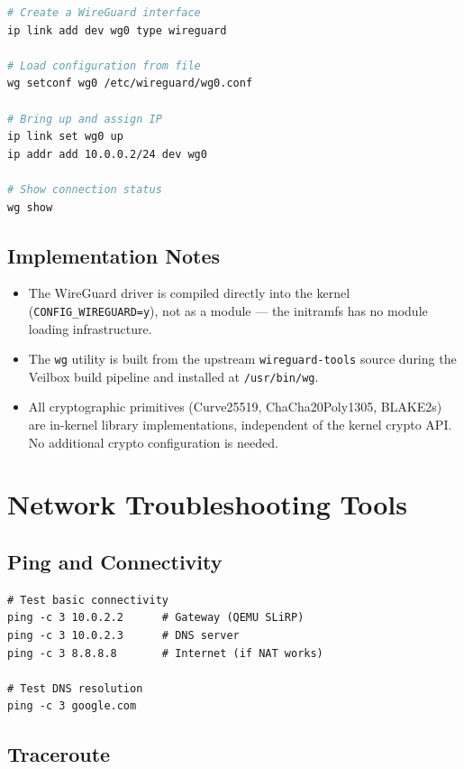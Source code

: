 \begin{lstlisting}[language=bash]
# Create a WireGuard interface
ip link add dev wg0 type wireguard

# Load configuration from file
wg setconf wg0 /etc/wireguard/wg0.conf

# Bring up and assign IP
ip link set wg0 up
ip addr add 10.0.0.2/24 dev wg0

# Show connection status
wg show
\end{lstlisting}

\subsection{Implementation Notes}

\begin{itemize}[nosep]
  \item The WireGuard driver is compiled directly into the kernel
        (\texttt{CONFIG\_WIREGUARD=y}), not as a module — the initramfs
        has no module loading infrastructure.
  \item The \texttt{wg} utility is built from the upstream
        \texttt{wireguard-tools} source during the Veilbox build
        pipeline and installed at \texttt{/usr/bin/wg}.
  \item All cryptographic primitives (Curve25519, ChaCha20Poly1305,
        BLAKE2s) are in-kernel library implementations, independent of
        the kernel crypto API. No additional crypto configuration is
        needed.
\end{itemize}

\section{Network Troubleshooting Tools}

\subsection{Ping and Connectivity}

\begin{lstlisting}
# Test basic connectivity
ping -c 3 10.0.2.2      # Gateway (QEMU SLiRP)
ping -c 3 10.0.2.3      # DNS server
ping -c 3 8.8.8.8       # Internet (if NAT works)

# Test DNS resolution
ping -c 3 google.com
\end{lstlisting}

\subsection{Traceroute}

